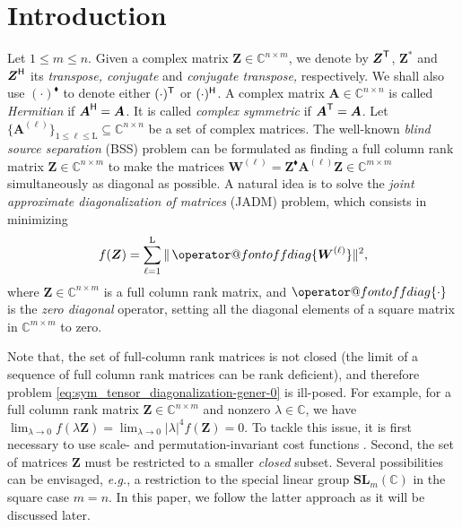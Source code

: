\documentclass[final,onefignum,onetabnum]{siamart190516}
\makeatletter
\newcounter{example}
\newcommand{\matr}[1]{\boldsymbol{#1}}
\newcommand{\T}{{\sf T}} %
\renewcommand{\H}{{\sf H}} %
\newcommand{\offdiag}[1]{\mathop{\operator@font offdiag}\{#1\}} %
\newcommand{\CC}{\mathbb{C}}
\newcommand{\matrelem}[1]{\mathrm{#1}}
\renewcommand{\H}{{\sf H}}      %
\renewcommand{\TH}{{\blacklozenge}}
\newcommand{\SL}{\mathbf{SL}}
\makeatother
\begin{document}
\section{Introduction}
Let $1\leq m\leq n$. 
Given a complex matrix $\matr{Z}\in\CC^{n\times m}$, we denote by $\matr{Z}^{\T}$, $\matr{Z}^{*}$ and $\matr{Z}^{\H}$ its \emph{transpose, conjugate} and \emph{conjugate transpose,} respectively. 
We shall also use  $(\cdot)^{\TH}$ to denote either $(\cdot)^{\T}$ or $(\cdot)^{\H}$.
A complex matrix $\matr{A}\in\CC^{n\times n}$ is called \emph{Hermitian} if $\matr{A}^{\H}=\matr{A}$.
It is called \emph{complex symmetric} if $\matr{A}^{\T}=\matr{A}$. 
Let $\{\matr{A}^{(\ell)}\}_{1\leq\ell\leq \matrelem{L}}\subseteq\CC^{n\times n}$ be a set of complex matrices. 
The well-known \emph{blind source separation} (BSS) problem \cite{Como94:sp,Como10:book,maurandi2014decoupled,souloumiac2009nonorthogonal} can be formulated as finding a full column rank matrix $\matr{Z}\in\CC^{n\times m}$ to make the matrices $\matr{W}^{(\ell)}=\matr{Z}^{\TH}\matr{A}^{(\ell)} \matr{Z}\in\CC^{m\times m}$ simultaneously as diagonal as possible. 
A natural idea is to solve the \emph{joint approximate diagonalization of matrices} (JADM) problem, which consists in minimizing
\begin{equation}\label{eq:sym_tensor_diagonalization-gener-0}
f(\matr{Z}) = \sum_{\ell=1}^{\matrelem{L}} \|\offdiag{\matr{W}^{(\ell)}}\|^2,
\end{equation}
where $\matr{Z}\in\CC^{n\times m}$ is a full column rank matrix, and $\offdiag{\cdot}$ is the \emph{zero diagonal} operator, setting all the diagonal elements of a square matrix in $\CC^{m\times m}$ to zero.

Note that, the set of full-column rank matrices is not closed (the limit of a sequence of full column rank matrices can be rank deficient), and therefore problem \cref{eq:sym_tensor_diagonalization-gener-0} is ill-posed.
For example,  for a full column rank matrix $\matr{Z}\in\CC^{n\times m}$ and nonzero $\lambda\in\CC$, we have $\lim_{\lambda\to 0}f(\lambda\matr{Z}) = \lim_{\lambda\to 0} |\lambda|^4f(\matr{Z}) =0$. 
To tackle this issue, it is first necessary to use scale- and permutation-invariant cost functions \cite{afsari2004gradient,yeredor2002non}.
Second, the set of matrices $\matr{Z}$ must be restricted to a smaller \emph{closed} subset. Several possibilities can be envisaged, \emph{e.g.}, a restriction to the special linear group $\SL_{m}(\CC)$ in the square case $m=n$. In this paper, we follow the latter approach as it will be discussed later. 
\end{document}
